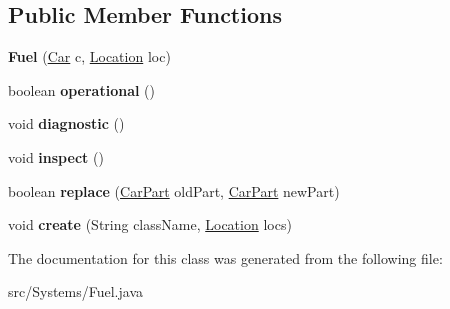 \subsection*{Public Member Functions}
\begin{DoxyCompactItemize}
\item 
\hypertarget{classSystems_1_1Fuel_aec4d2cb06ca1feb0f5c7dc346f3d670a}{}{\bfseries Fuel} (\hyperlink{classCars_1_1Car}{Car} c, \hyperlink{enumEnums_1_1Location}{Location} loc)\label{classSystems_1_1Fuel_aec4d2cb06ca1feb0f5c7dc346f3d670a}

\item 
\hypertarget{classSystems_1_1Fuel_a5aae861a9a805c9d88ff0ac43484e7d2}{}boolean {\bfseries operational} ()\label{classSystems_1_1Fuel_a5aae861a9a805c9d88ff0ac43484e7d2}

\item 
\hypertarget{classSystems_1_1Fuel_a6eb19f16160cfd2d00ca17e4bd55d960}{}void {\bfseries diagnostic} ()\label{classSystems_1_1Fuel_a6eb19f16160cfd2d00ca17e4bd55d960}

\item 
\hypertarget{classSystems_1_1Fuel_ab993ea71389880a7ac6056bc2c3d27e1}{}void {\bfseries inspect} ()\label{classSystems_1_1Fuel_ab993ea71389880a7ac6056bc2c3d27e1}

\item 
\hypertarget{classSystems_1_1Fuel_ad3102e22490e5e86baaccfb4e98a428a}{}boolean {\bfseries replace} (\hyperlink{classCars_1_1CarPart}{Car\+Part} old\+Part, \hyperlink{classCars_1_1CarPart}{Car\+Part} new\+Part)\label{classSystems_1_1Fuel_ad3102e22490e5e86baaccfb4e98a428a}

\item 
\hypertarget{classSystems_1_1Fuel_a4f13df680679878b3b5ebee9f304bc73}{}void {\bfseries create} (String class\+Name, \hyperlink{enumEnums_1_1Location}{Location} locs)\label{classSystems_1_1Fuel_a4f13df680679878b3b5ebee9f304bc73}

\end{DoxyCompactItemize}


The documentation for this class was generated from the following file\+:\begin{DoxyCompactItemize}
\item 
src/\+Systems/Fuel.\+java\end{DoxyCompactItemize}
